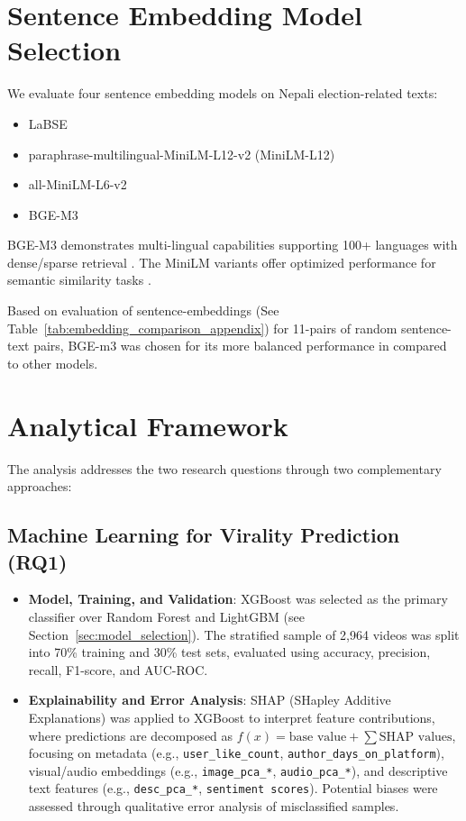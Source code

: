 \documentclass[12pt,a4paper]{report}
\begin{document}
\section{Sentence Embedding Model Selection}
We evaluate four sentence embedding models on Nepali election-related texts:
\begin{itemize}
    \item LaBSE \parencite{reimers-2019}
    \item paraphrase-multilingual-MiniLM-L12-v2 (MiniLM-L12) \parencite{paraphrase-multilingual-MiniLM-L12-v2}
    \item all-MiniLM-L6-v2 \parencite{all-MiniLM-L6-v2}
    \item BGE-M3 \parencite{bge-m3}
\end{itemize}

BGE-M3 demonstrates multi-lingual capabilities supporting 100+ languages with dense/sparse retrieval \parencite{bge-m3}. The MiniLM variants offer optimized performance for semantic similarity tasks \parencite{reimers-2019}.

Based on evaluation of sentence-embeddings (See Table~\ref{tab:embedding_comparison_appendix}) for 11-pairs of random sentence-text pairs, BGE-m3 was chosen for its more balanced performance in compared to other models. 
\newpage
\section{Analytical Framework}

The analysis addresses the two research questions through two complementary approaches:

\subsection{Machine Learning for Virality Prediction (RQ1)}
\begin{itemize}
    \item \textbf{Model, Training, and Validation}: XGBoost was selected as the primary classifier over Random Forest and LightGBM (see Section~\ref{sec:model_selection}). The stratified sample of 2,964 videos was split into 70\% training and 30\% test sets, evaluated using accuracy, precision, recall, F1-score, and AUC-ROC.
    
    \item \textbf{Explainability and Error Analysis}: SHAP (SHapley Additive Explanations) was applied to XGBoost to interpret feature contributions, where predictions are decomposed as $f(x) = \text{base value} + \sum \text{SHAP values}$, focusing on metadata (e.g., \texttt{user\_like\_count}, \texttt{author\_days\_on\_platform}), visual/audio embeddings (e.g., \texttt{image\_pca\_*}, \texttt{audio\_pca\_*}), and descriptive text features (e.g., \texttt{desc\_pca\_*}, \texttt{sentiment scores}). Potential biases were assessed through qualitative error analysis of misclassified samples.
\end{itemize}
\end{document}
